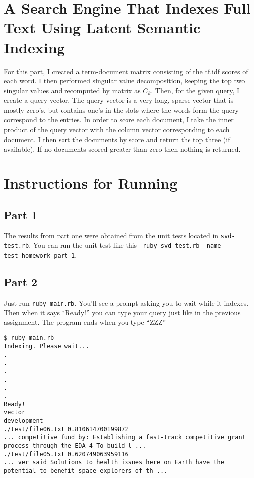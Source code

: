 \documentclass[12pt]{article}
\begin{document}
\section{A Search Engine That Indexes Full Text Using Latent Semantic Indexing} %
\label{sec:a_search_engine_that_indexes_full_text_using_latent_semantic_indexing}
For this part, I created a term-document matrix consisting of the tf.idf scores of each word. I then performed singular value decomposition, keeping the top two singular values and recomputed by matrix as $C_k$. Then, for the given query, I create a query vector. The query vector is a very long, sparse vector that is mostly zero's, but contains one's in the slots where the words form the query correspond to the entries. In order to score each document, I take the inner product of the query vector with the column vector corresponding to each document. I then sort the documents by score and return the top three (if available). If no documents scored greater than zero then nothing is returned.

\section{Instructions for Running} %
\label{sec:instructions_for_running}
\subsection{Part 1} %
\label{sub:part_1}
The results from part one were obtained from the unit tests located in \texttt{svd-test.rb}. You can run the unit test like this \texttt{
ruby svd-test.rb --name test\_homework\_part\_1}.
\pagebreak
\subsection{Part 2} %
\label{sub:part_2}
Just run \texttt{ruby main.rb}. You'll see a prompt asking you to wait while it indexes. Then when it says ``Ready!'' you can type your query just like in the previous assignment. The program ends when you type ``ZZZ''
\begin{lstlisting}
$ ruby main.rb 
Indexing. Please wait...
.
.
.
.
.
.
Ready!
vector
development
./test/file06.txt 0.810614700199872
... competitive fund by: Establishing a fast-track competitive grant process through the EDA 4 To build l ...
./test/file05.txt 0.620749063959116
... ver said Solutions to health issues here on Earth have the potential to benefit space explorers of th ...
\end{lstlisting}
\end{document}
